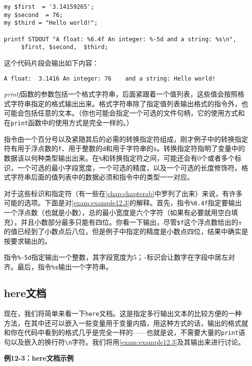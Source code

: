 \begin{lstlisting}
my $first  = '3.14159265';
my $second  = 76;
my $third = "Hello world!";

printf STDOUT "A float: %6.4f An integer: %-5d and a string: %s\n", 
     $first, $second,  $third;
\end{lstlisting}

这个代码片段会输出如下内容：

\begin{lstlisting}
A float:  3.1416 An integer: 76    and a string: Hello world!
\end{lstlisting}

\textit{printf}函数的参数包括一个格式字符串，后面紧跟着一个值列表，这些值会按照格式字符串指定的格式输出出来。格式字符串除了指定值列表输出格式的指令外，也可能会包括任意的文本。（你也可能会指定一个可选的文件句柄，它的使用方式和在\verb|print|函数中的使用方式是完全一样的。）

指令由一个百分号以及紧随其后的必需的转换指定符组成，刚才例子中的转换指定符有用于浮点数的\verb|f|、用于整数的\verb|d|和用于字符串的\verb|s|。转换指定符指明了变量中的数据该以何种类型输出出来。在\verb|%|和转换指定符之间，可能还会有0个或者多个标识，一个可选的最小字段宽度，一个可选的精度，以及一个可选的长度修饰符。格式字符串后面的值列表中的数据必须和指令中的类型一一对应。

对于这些标识和指定符（有一些在\autoref{chap:chapterab}中罗列了出来）来说，有许多可能的选项。下面是对\autoref{exam:example12.3}的解释。首先，指令\verb|%6.4f|指定要输出一个浮点数（也就是小数），总的最小宽度是六个字符（如果有必要就用空白填充），并且小数部分最多只能有四位。你看一下输出，尽管\verb|$f|这个浮点数给出的$\pi$的值已经到了小数点后八位，但是例子中指定的精度是小数点四位，结果中确实是按要求输出的。

指令\verb|%-5d|指定输出一个整数，其字段宽度为5；\verb|-|标识会让数字在字段中居左对齐。最后，指令\verb|%s|输出一个字符串。

\subsection{here文档}
现在，我们将简单来看一下\verb|here|文档。这是指定多行输出文本的比较方便的一种方法，在其中还可以嵌入一些变量用于变量内插，用这种方式的话，输出的格式就和你在代码中看到的格式几乎是完全一样的——也就是说，不需要大量的\verb|print|语句以及嵌入的换行符\verb|\n|字符。我们将用\autoref{exam:example12.3}及其输出来进行讨论。

\textbf{例12-3：here文档示例}


